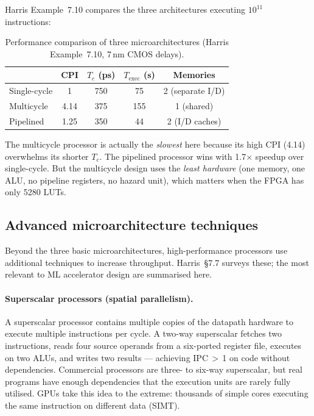 \documentclass[9pt, a4paper]{extarticle}
\begin{document}
Harris Example~7.10 compares the three architectures executing $10^{11}$ instructions:

\begin{table}[htbp]
\centering\small
\begin{tabular}{@{}l c c c c@{}}
    \toprule
    & CPI & $T_c$ (ps) & $T_{\text{exec}}$ (s) & Memories \\
    \midrule
    Single-cycle & 1 & 750 & 75 & 2 (separate I/D) \\
    Multicycle & 4.14 & 375 & 155 & 1 (shared) \\
    Pipelined & 1.25 & 350 & 44 & 2 (I/D caches) \\
    \bottomrule
\end{tabular}
\caption{Performance comparison of three microarchitectures (Harris Example~7.10, 7\,nm CMOS delays).}
\label{tab:microarch-compare}
\end{table}

The multicycle processor is actually the \emph{slowest} here because its high CPI (4.14) overwhelms its shorter $T_c$. The pipelined processor wins with 1.7$\times$ speedup over single-cycle. But the multicycle design uses the \emph{least hardware} (one memory, one ALU, no pipeline registers, no hazard unit), which matters when the FPGA has only 5280 LUTs.

\subsection{Advanced microarchitecture techniques}

Beyond the three basic microarchitectures, high-performance processors use additional techniques to increase throughput. Harris~\S7.7 surveys these; the most relevant to ML accelerator design are summarised here.

\paragraph{Superscalar processors (spatial parallelism).} A superscalar processor contains multiple copies of the datapath hardware to execute multiple instructions per cycle. A two-way superscalar fetches two instructions, reads four source operands from a six-ported register file, executes on two ALUs, and writes two results --- achieving IPC\,$>$\,1 on code without dependencies. Commercial processors are three- to six-way superscalar, but real programs have enough dependencies that the execution units are rarely fully utilised. GPUs take this idea to the extreme: thousands of simple cores executing the same instruction on different data (SIMT).
\end{document}
